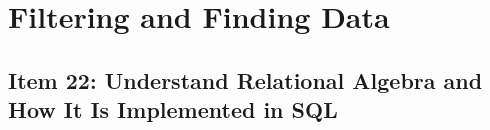 \chapter{Filtering and Finding Data}
\section{Item 22: Understand Relational Algebra and How It Is Implemented in SQL}
